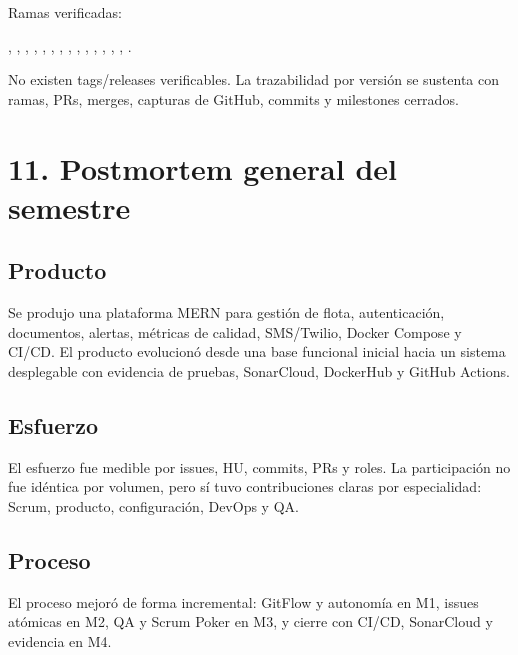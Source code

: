 \documentclass[11pt,a4paper]{article}
\begin{document}
Ramas verificadas:

\texttt{}, \texttt{}, \texttt{}, \texttt{}, \texttt{}, \texttt{}, \texttt{}, \texttt{}, \texttt{}, \texttt{}, \texttt{}, \texttt{}, \texttt{}, \texttt{}, \texttt{}.

No existen tags/releases verificables. La trazabilidad por versión se sustenta con ramas, PRs, merges, capturas de GitHub, commits y milestones cerrados.

\section{11. Postmortem general del semestre}

\subsection{Producto}

Se produjo una plataforma MERN para gestión de flota, autenticación, documentos, alertas, métricas de calidad, SMS/Twilio, Docker Compose y CI/CD. El producto evolucionó desde una base funcional inicial hacia un sistema desplegable con evidencia de pruebas, SonarCloud, DockerHub y GitHub Actions.

\subsection{Esfuerzo}

El esfuerzo fue medible por issues, HU, commits, PRs y roles. La participación no fue idéntica por volumen, pero sí tuvo contribuciones claras por especialidad: Scrum, producto, configuración, DevOps y QA.

\subsection{Proceso}

El proceso mejoró de forma incremental: GitFlow y autonomía en M1, issues atómicas en M2, QA y Scrum Poker en M3, y cierre con CI/CD, SonarCloud y evidencia en M4.
\end{document}

